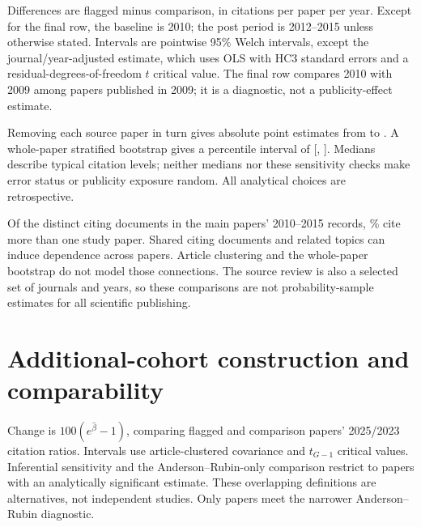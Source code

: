 \documentclass[11pt,letterpaper]{article}
\begin{document}
\begin{table}[htbp]
\centering
\caption{Absolute citation changes under alternative comparisons}
\label{tab:sensitivity}
\small

\par\smallskip
\begin{minipage}{\linewidth}\footnotesize
Differences are flagged minus comparison, in citations per paper per year. Except for the final row, the baseline is 2010; the post period is 2012--2015 unless otherwise stated. Intervals are pointwise 95\% Welch intervals, except the journal/year-adjusted estimate, which uses OLS with HC3 standard errors and a residual-degrees-of-freedom $t$ critical value. The final row compares 2010 with 2009 among papers published in 2009; it is a diagnostic, not a publicity-effect estimate.
\end{minipage}
\end{table}

Removing each source paper in turn gives absolute point estimates from \LeaveMin{} to \LeaveMax. A whole-paper stratified bootstrap gives a percentile interval of [\BootstrapLower, \BootstrapUpper]. Medians describe typical citation levels; neither medians nor these sensitivity checks make error status or publicity exposure random. All analytical choices are retrospective.

Of the distinct citing documents in the main papers' 2010--2015 records, \SharedPercent\% cite more than one study paper. Shared citing documents and related topics can induce dependence across papers. Article clustering and the whole-paper bootstrap do not model those connections. The source review is also a selected set of journals and years, so these comparisons are not probability-sample estimates for all scientific publishing.

\section{Additional-cohort construction and comparability}\label{app:extensions}
\begin{table}[htbp]
\centering
\caption{Alternative diagnostics in the instrumental-variable audit}
\label{tab:lal}
\small

\par\smallskip
\begin{minipage}{\linewidth}\footnotesize
Change is $100(e^{\widehat\beta}-1)$, comparing flagged and comparison papers' 2025/2023 citation ratios. Intervals use article-clustered covariance and $t_{G-1}$ critical values. Inferential sensitivity and the Anderson--Rubin-only comparison restrict to papers with an analytically significant estimate. These overlapping definitions are alternatives, not independent studies. Only \LalARCount{} papers meet the narrower Anderson--Rubin diagnostic.
\end{minipage}
\end{table}
\end{document}

